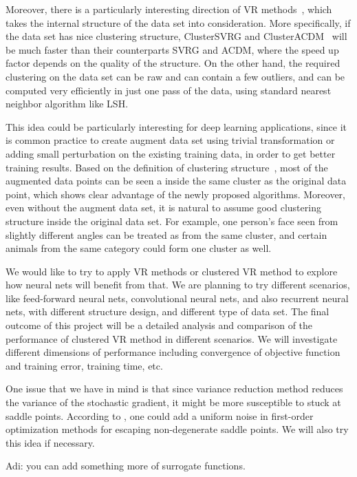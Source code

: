 \documentclass{article} %
\begin{document}
Moreover, there is a particularly interesting direction of VR methods~\cite{exploitingstructure,HLM2015}, which takes the internal structure of the data set into consideration. More specifically, if the data set has nice clustering structure, ClusterSVRG and ClusterACDM~\cite{exploitingstructure} will be much faster than their counterparts SVRG and ACDM, where the speed up factor depends on the quality of the structure. 
On the other hand, 
the required clustering on the data set can be raw and can contain a few outliers, and can be computed very efficiently in just one pass of the data, using standard nearest neighbor algorithm like LSH. 

This idea could be particularly interesting for deep learning applications, since it is common practice to create augment data set using trivial transformation or adding small perturbation on the existing training data, in order to get better training results. Based on the definition of clustering structure~\cite{exploitingstructure}, most of the augmented data points can be seen a inside the same cluster as the original data point, which shows clear advantage of the newly proposed algorithms. Moreover, even without the augment data set, it is natural to assume good clustering structure inside the original data set. For example, one person's face seen from slightly different angles can be treated as from the same cluster, and certain animals from the same category could form one cluster as well. 


We would like to try to apply VR methods or clustered VR method to explore how neural nets will benefit from that. We are planning to try different scenarios, like feed-forward neural nets, convolutional neural nets, and also recurrent neural nets, with different structure design, and different type of data set. The final outcome of this project will be a detailed analysis and comparison of the performance of clustered VR method in different scenarios. We will investigate different dimensions of performance including convergence of objective function and training error, training time, etc. 

One issue that we have in mind is that since variance reduction method reduces the variance of the stochastic gradient, it might be more susceptible to stuck at saddle points. According to \cite{escapesaddle}, one could add a uniform noise in first-order optimization methods for escaping non-degenerate saddle points. We will also try this idea if necessary.

Adi: you can add something more of surrogate functions.



\end{document}
